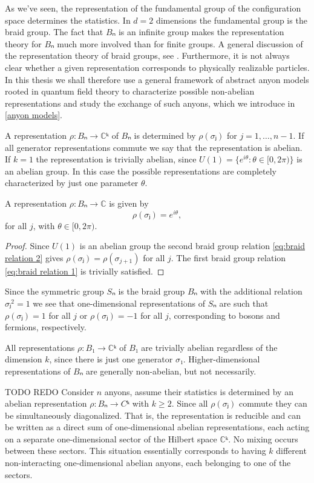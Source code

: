 As we've seen, the representation of the fundamental group of the configuration space determines the statistics. In $d=2$ dimensions the fundamental group is the braid group. The fact that $Bₙ$ is an infinite group makes the representation theory for $Bₙ$ much more involved than for finite groups. A general discussion of the representation theory of braid groups, see \cite{oskar}. Furthermore, it is not always clear whether a given representation corresponds to physically realizable particles. In this thesis we shall therefore use a general framework of abstract anyon models rooted in quantum field theory to characterize possible non-abelian representations and study the exchange of such anyons, which we introduce in \cref{anyon models}.

A representation $ρ:Bₙ→ℂᵏ$ of $Bₙ$ is determined by $ρ(σⱼ)$ for $j = 1,…,n-1$. If all generator representations commute we say that the representation is abelian. If $k = 1$ the representation is trivially abelian, since $U(1) = \{e^{iθ}:θ∈[0,2π)\}$ is an abelian group. In this case the possible representations are completely characterized by just one parameter $θ$.

\begin{lemma}
  A representation $ρ:Bₙ→ℂ$ is given by
  \begin{equation}
    ρ(σⱼ) = e^{iθ},
  \end{equation}
  for all $j$, with $θ∈[0,2π)$.
\end{lemma}
\begin{proof}
  Since $U(1)$ is an abelian group the second braid group relation \cref{eq:braid relation 2} gives $ρ(σⱼ) = ρ(σ_{j+1})$ for all $j$. The first braid group relation \cref{eq:braid relation 1} is trivially satisfied.
\end{proof}

\begin{remark}
  Since the symmetric group $Sₙ$ is the braid group $Bₙ$ with the additional relation $σⱼ^2 = 1$ we see that one-dimensional representations of $Sₙ$ are such that $ρ(σⱼ) = 1$ for all $j$ or $ρ(σⱼ) = -1$ for all $j$, corresponding to bosons and fermions, respectively.
\end{remark}


All representations $ρ:B₁→ℂᵏ$ of $B₁$ are trivially abelian regardless of the dimension $k$, since there is just one generator $σ₁$. Higher-dimensional representations of $Bₙ$ are generally non-abelian, but not necessarily.

\begin{example} TODO REDO
  Consider $n$ anyons, assume their statistics is determined by an abelian representation $ρ:Bₙ→Cᵏ$ with $k \ge 2$. Since all $ρ(σⱼ)$ commute they can be simultaneously diagonalized. That is, the representation is reducible and can be written as a direct sum of one-dimensional abelian representations, each acting on a separate one-dimensional sector of the Hilbert space $ℂᵏ$. No mixing occurs between these sectors. This situation essentially corresponds to having $k$ different non-interacting one-dimensional abelian anyons, each belonging to one of the sectors.
\end{example}

